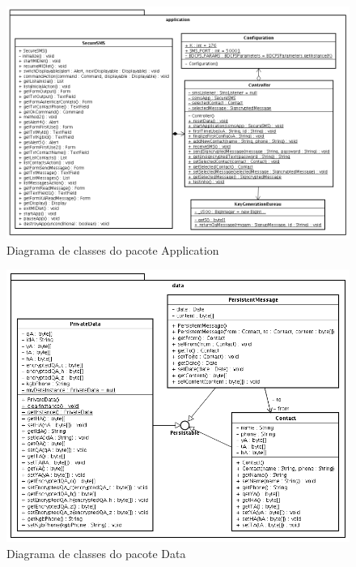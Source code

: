 \documentclass[a4paper,capchap,espacoduplo,normaltoc]{abntepusp}
\begin{document}
\begin{figure}
	\centering
		\includegraphics[width=1.00\textwidth]{figuras/ClassDiagramApplication.png}
	\caption{Diagrama de classes do pacote Application}
	\label{fig:ClassDiagramApplication}
\end{figure}

\begin{figure}
	\centering
		\includegraphics[width=1.00\textwidth]{figuras/ClassDiagramData.png}
	\caption{Diagrama de classes do pacote Data}
	\label{fig:ClassDiagramData}
\end{figure}
\end{document}
